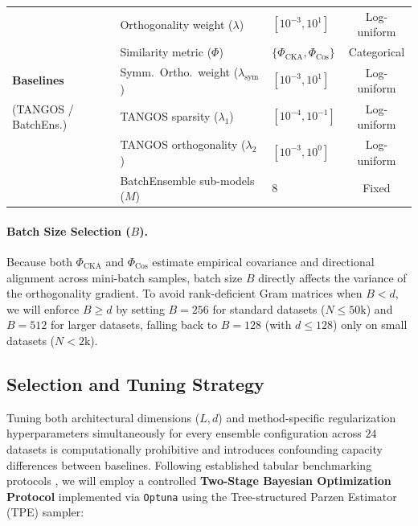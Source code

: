 \documentclass[11pt, a4paper]{article}
\begin{document}
\begin{table}[htbp]
\begin{tabular}{lllc}
        & Orthogonality weight ($\lambda$) & $[10^{-3}, 10^{1}]$ & Log-uniform \\
        & Similarity metric ($\Phi$) & $\{\Phi_{\text{CKA}}, \Phi_{\text{Cos}}\}$ & Categorical \\
        \midrule
        \textbf{Baselines} 
        & Symm.\ Ortho.\ weight ($\lambda_{\text{sym}}$) & $[10^{-3}, 10^{1}]$ & Log-uniform \\
        (TANGOS / BatchEns.) & TANGOS sparsity ($\lambda_1$) & $[10^{-4}, 10^{-1}]$ & Log-uniform \\
        & TANGOS orthogonality ($\lambda_2$) & $[10^{-3}, 10^{0}]$ & Log-uniform \\
        & BatchEnsemble sub-models ($M$) & $8$ & Fixed \\
        \bottomrule
    \end{tabular}
\end{table}

\paragraph{Batch Size Selection ($B$).}
Because both $\Phi_{\text{CKA}}$ and $\Phi_{\text{Cos}}$ estimate empirical covariance and directional alignment across mini-batch samples, batch size $B$ directly affects the variance of the orthogonality gradient. To avoid rank-deficient Gram matrices when $B < d$, we will enforce $B \ge d$ by setting $B = 256$ for standard datasets ($N \le 50\text{k}$) and $B = 512$ for larger datasets, falling back to $B = 128$ (with $d \le 128$) only on small datasets ($N < 2\text{k}$).

\subsection{Selection and Tuning Strategy}
Tuning both architectural dimensions ($L, d$) and method-specific regularization hyperparameters simultaneously for every ensemble configuration across $24$ datasets is computationally prohibitive and introduces confounding capacity differences between baselines. Following established tabular benchmarking protocols \cite{kadra2021well, grinsztajn2022why}, we will employ a controlled \textbf{Two-Stage Bayesian Optimization Protocol} implemented via \texttt{Optuna} using the Tree-structured Parzen Estimator (TPE) sampler:
\end{document}
